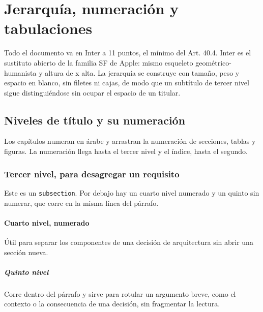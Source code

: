 \documentclass[carta,firma,borrador]{lafrox}
\begin{document}
\portadalafrox

\indicelafrox

\chapter{Jerarquía, numeración y tabulaciones}
\label{cap:tipografia}

Todo el documento va en Inter a 11 puntos, el mínimo del Art. 40.4. Inter es
el sustituto abierto de la familia SF de Apple: mismo esqueleto
geométrico-humanista y altura de x alta. La jerarquía se construye con tamaño,
peso y espacio en blanco, sin filetes ni cajas, de modo que un subtítulo de
tercer nivel sigue distinguiéndose sin ocupar el espacio de un titular.


\section{Niveles de título y su numeración}

Los capítulos numeran en árabe y arrastran la numeración de secciones, tablas
y figuras. La numeración llega hasta el tercer nivel y el índice, hasta el
segundo.

\subsection{Tercer nivel, para desagregar un requisito}

Este es un \texttt{subsection}. Por debajo hay un cuarto nivel numerado y un
quinto sin numerar, que corre en la misma línea del párrafo.

\subsubsection{Cuarto nivel, numerado}

Útil para separar los componentes de una decisión de arquitectura sin abrir
una sección nueva.

\paragraph{Quinto nivel} Corre dentro del párrafo y sirve para rotular un
argumento breve, como el contexto o la consecuencia de una decisión, sin
fragmentar la lectura.
\end{document}
